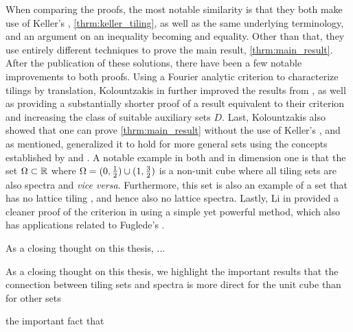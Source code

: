 \documentclass[../thesis.tex]{subfiles}
\begin{document}
When comparing the proofs, the most notable similarity is that they both make use of Keller's , \cref{thrm:keller_tiling}, as well as the same underlying terminology, and an argument on an inequality becoming and equality. Other than that, they use entirely different techniques to prove the main result, \cref{thrm:main_result}. After the publication of these solutions, there have been a few notable improvements to both proofs. Using a Fourier analytic criterion to characterize tilings by translation, Kolountzakis in \cite{kolountzakisPackingTilingOrthogonality2000} further improved the results from \cite{lagariasOrthonormalBasesExponentials2000}, as well as providing a substantially shorter proof of a result equivalent to their criterion and increasing the class of suitable auxiliary sets $D$. Last, Kolountzakis also showed that one can prove \cref{thrm:main_result} without the use of Keller's , and as mentioned, generalized it to hold for more general sets using the concepts established by \cite{lagariasOrthonormalBasesExponentials2000} and \cite{kolountzakisPackingTilingOrthogonality2000}. A notable example in both \cite{lagariasOrthonormalBasesExponentials2000} and \cite{kolountzakisPackingTilingOrthogonality2000} in dimension one is that the set $\Omega\subset \mathbb{R}$ where $\Omega = (0,\frac{1}{2}) \cup  (1,\frac{3}{2})$ is a non-unit cube where all tiling sets are also spectra and \emph{vice versa}. Furthermore, this set is also an example of a set that has no lattice tiling \cite{lagariasTilingLineTranslates1996}, and hence also no lattice spectra. Lastly, Li in \cite{liCharacterizationsSpectraTilings2004}  provided a cleaner proof of the criterion in \cite{kolountzakisPackingTilingOrthogonality2000} using a simple yet powerful method, which also has applications related to Fuglede's . 


As a closing thought on this thesis, ... 

As a closing thought on this thesis, we highlight the important results that the connection between tiling sets and spectra is more direct for the unit cube than for other sets 


the important fact that  



\end{document}
